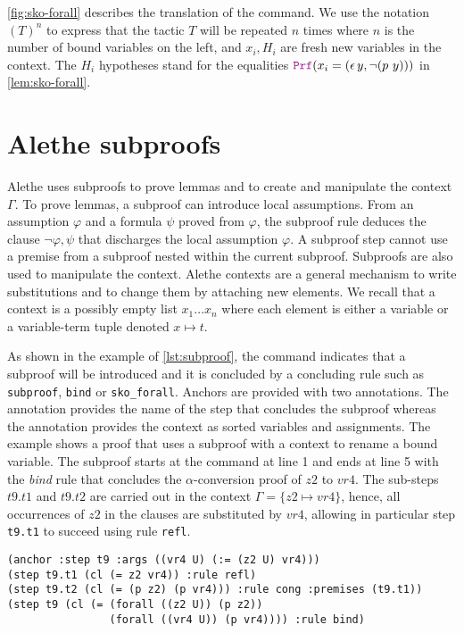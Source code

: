\cref{fig:sko-forall} describes the translation of the  command. We use the notation $(T)^n$ to express that the tactic $T$ will be repeated $n$ times where $n$ is the number of bound variables on the left, and $x_i, H_i$ are fresh new variables in the context.
The $H_i$ hypotheses stand for the equalities $\prf (x_i = (\epsilon\,y, \neg (p~y)))$ in \cref{lem:sko-forall}.

\section{Alethe subproofs}
\label{sec:subproof}

Alethe uses subproofs to prove lemmas and to create and manipulate the context $\Gamma$. To prove lemmas, a subproof can introduce local assumptions.
From an assumption $\varphi$ and a formula $\psi$ proved from $\varphi$, the subproof rule deduces the clause $\neg \varphi, \psi$ that discharges the local assumption $\varphi$.
A subproof step cannot use a premise from a subproof nested within the current subproof. Subproofs are also used to manipulate the context.
Alethe contexts are a general mechanism to write substitutions and to change them by attaching new elements.
We recall that a context is a possibly empty list $x_1 \dots x_n$ where each element is either a variable or a variable-term tuple denoted $x \mapsto t$.

As shown in the example of \cref{lst:subproof}, the  command indicates that a subproof will be introduced and it is concluded by a concluding rule such as \texttt{subproof},
\texttt{bind} or \texttt{sko\_forall}. Anchors are provided with two annotations. The annotation  provides the name of the step that concludes the subproof whereas the annotation  provides the context as sorted variables and assignments. The example shows a proof that uses a subproof with a context to rename a bound variable.
The subproof starts at the  command at line 1 and ends at line 5 with the \emph{bind} rule that concludes the $\alpha$-conversion proof of $z2$ to $vr4$. The sub-steps $t9.t1$ and $t9.t2$ are carried out in the context $\Gamma = \{ z2 \mapsto vr4 \}$, hence, all occurrences of $z2$ in the clauses are substituted by $vr4$, allowing in particular step \texttt{t9.t1} to succeed using rule \texttt{refl}.

\begin{lstlisting}[language=SMT,mathescape=true, caption={Alethe subproof example.}, label={lst:subproof}]
(anchor :step t9 :args ((vr4 U) (:= (z2 U) vr4)))
(step t9.t1 (cl (= z2 vr4)) :rule refl)
(step t9.t2 (cl (= (p z2) (p vr4))) :rule cong :premises (t9.t1))
(step t9 (cl (= (forall ((z2 U)) (p z2))
                (forall ((vr4 U)) (p vr4)))) :rule bind)
\end{lstlisting}

